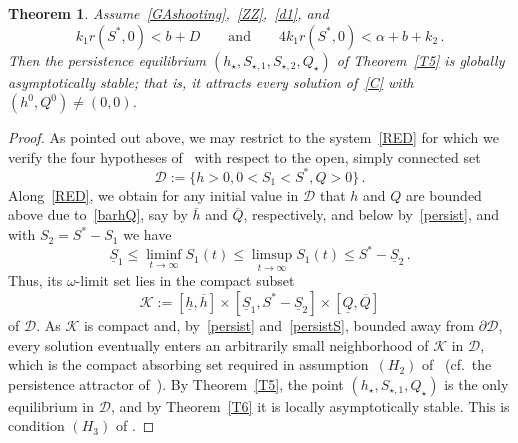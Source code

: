 \documentclass[reqno,11pt]{amsart}
\newtheorem{thm}{Theorem}[section]
\numberwithin{equation}{section}
\begin{document}
\begin{thm}\label{Tglobal}
Assume~\eqref{GAshooting},~\eqref{ZZ},~\eqref{d1}, and
\begin{equation}\label{C1C2}
k_1 r(S^*,0)<b+D\qquad\text{and}\qquad 4k_1 r(S^*,0)<\alpha+b+k_2\,.
\end{equation}
Then the persistence equilibrium $(h_\star,S_{\star,1},S_{\star,2},Q_\star)$ of Theorem~\ref{T5} is globally
asymptotically stable; that is, it attracts every solution of~\eqref{C} with $(h^0,Q^0)\neq(0,0)$.
\end{thm}


\begin{proof} 
As pointed out above, we may restrict to the system~\eqref{RED} for which we verify the four hypotheses of~\cite[Theorem~3.5]{LiMuldowney1996} with respect to
the open, simply connected set 
\[
\mathcal D:= \{h>0,0<S_1<S^*,Q>0\}\, .
\] 
Along~\eqref{RED}, we obtain for any initial value in $\mathcal D$ that $h$ and $Q$
are bounded above due to~\eqref{barhQ}, say by $\overline{h}$ and $\overline{Q}$, respectively, and below by~\eqref{persist}, and 
with $S_2=S^*-S_1$ we have 
\[
\underline{S}_1\le\liminf_{t\to\infty}S_1(t)\le\limsup_{t\to\infty}S_1(t)\le S^*-\underline{S}_2\,.
\]
Thus, its $\omega$-limit set lies in the compact subset
\[
\mathcal{K}:=[\underline h,\overline h]\times[\underline{S}_1,S^*-\underline{S}_2]\times[\underline Q,\overline Q]
\]
of $\mathcal D$. As $\mathcal K$ is compact and, by~\eqref{persist} and~\eqref{persistS}, bounded away from
$\partial\mathcal D$, every solution eventually enters an arbitrarily small neighborhood of $\mathcal K$ in
$\mathcal D$, which is the compact absorbing set required in assumption~$(H_2)$ of~\cite{LiMuldowney1996}
(cf.~the persistence attractor of~\cite[Theorem~5.7]{SmithThieme2011}).
By Theorem~\ref{T5}, the
point $(h_\star,S_{\star,1},Q_\star)$ is the only equilibrium in $\mathcal D$, and by Theorem~\ref{T6} it is locally
asymptotically stable. This is condition $(H_3)$ of \cite{LiMuldowney1996}.


\end{proof}
\end{document}
